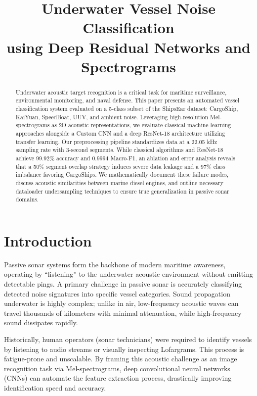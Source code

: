 \documentclass[conference]{IEEEtran}
\begin{document}
\title{Underwater Vessel Noise Classification\\using Deep Residual Networks and Spectrograms}
\author{
}
\maketitle

\begin{abstract}
Underwater acoustic target recognition is a critical task for maritime surveillance, environmental monitoring, and naval defense. This paper presents an automated vessel classification system evaluated on a 5-class subset of the ShipsEar dataset: CargoShip, KaiYuan, SpeedBoat, UUV, and ambient noise. Leveraging high-resolution Mel-spectrograms as 2D acoustic representations, we evaluate classical machine learning approaches alongside a Custom CNN and a deep ResNet-18 architecture utilizing transfer learning. Our preprocessing pipeline standardizes data at a 22.05 kHz sampling rate with 3-second segments. While classical algorithms and ResNet-18 achieve 99.92\% accuracy and 0.9994 Macro-F1, an ablation and error analysis reveals that a 50\% segment overlap strategy induces severe data leakage and a 97\% class imbalance favoring CargoShips. We mathematically document these failure modes, discuss acoustic similarities between marine diesel engines, and outline necessary dataloader undersampling techniques to ensure true generalization in passive sonar domains.
\end{abstract}

\section{Introduction}
Passive sonar systems form the backbone of modern maritime awareness, operating by ``listening'' to the underwater acoustic environment without emitting detectable pings. A primary challenge in passive sonar is accurately classifying detected noise signatures into specific vessel categories. Sound propagation underwater is highly complex; unlike in air, low-frequency acoustic waves can travel thousands of kilometers with minimal attenuation, while high-frequency sound dissipates rapidly.

Historically, human operators (sonar technicians) were required to identify vessels by listening to audio streams or visually inspecting Lofargrams. This process is fatigue-prone and unscalable. By framing this acoustic challenge as an image recognition task via Mel-spectrograms, deep convolutional neural networks (CNNs) can automate the feature extraction process, drastically improving identification speed and accuracy. 
\end{document}
